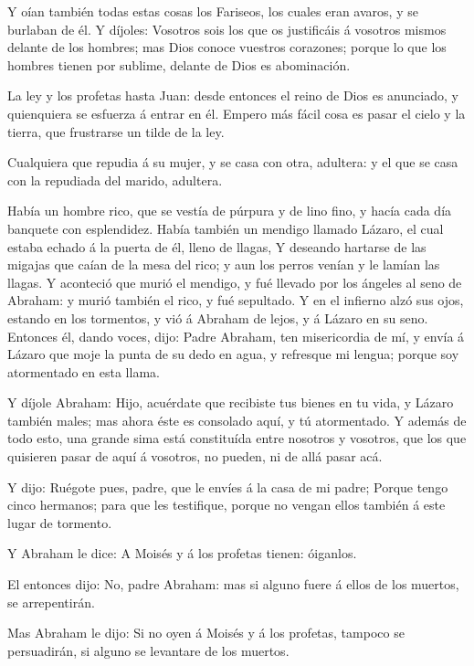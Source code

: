  Y oían también todas estas cosas los Fariseos, los cuales
eran avaros, y se burlaban de él.  Y díjoles: Vosotros sois
los que os justificáis á vosotros mismos delante de los hombres; mas
Dios conoce vuestros corazones; porque lo que los hombres tienen por
sublime, delante de Dios es abominación.

 La ley y los profetas hasta Juan: desde entonces el reino
de Dios es anunciado, y quienquiera se esfuerza á entrar en él.
 Empero más fácil cosa es pasar el cielo y la tierra, que
frustrarse un tilde de la ley.

 Cualquiera que repudia á su mujer, y se casa con otra,
adultera: y el que se casa con la repudiada del marido, adultera.

 Había un hombre rico, que se vestía de púrpura y de lino
fino, y hacía cada día banquete con esplendidez.  Había
también un mendigo llamado Lázaro, el cual estaba echado á la puerta de
él, lleno de llagas,  Y deseando hartarse de las migajas
que caían de la mesa del rico; y aun los perros venían y le lamían las
llagas.  Y aconteció que murió el mendigo, y fué llevado
por los ángeles al seno de Abraham: y murió también el rico, y fué
sepultado.  Y en el infierno alzó sus ojos, estando en los
tormentos, y vió á Abraham de lejos, y á Lázaro en su seno.
 Entonces él, dando voces, dijo: Padre Abraham, ten
misericordia de mí, y envía á Lázaro que moje la punta de su dedo en
agua, y refresque mi lengua; porque soy atormentado en esta llama.

 Y díjole Abraham: Hijo, acuérdate que recibiste tus bienes
en tu vida, y Lázaro también males; mas ahora éste es consolado aquí, y
tú atormentado.  Y además de todo esto, una grande sima
está constituída entre nosotros y vosotros, que los que quisieren pasar
de aquí á vosotros, no pueden, ni de allá pasar acá.

 Y dijo: Ruégote pues, padre, que le envíes á la casa de mi
padre;  Porque tengo cinco hermanos; para que les
testifique, porque no vengan ellos también á este lugar de tormento.

 Y Abraham le dice: A Moisés y á los profetas tienen:
óiganlos.

 El entonces dijo: No, padre Abraham: mas si alguno fuere á
ellos de los muertos, se arrepentirán.

 Mas Abraham le dijo: Si no oyen á Moisés y á los profetas,
tampoco se persuadirán, si alguno se levantare de los muertos.

